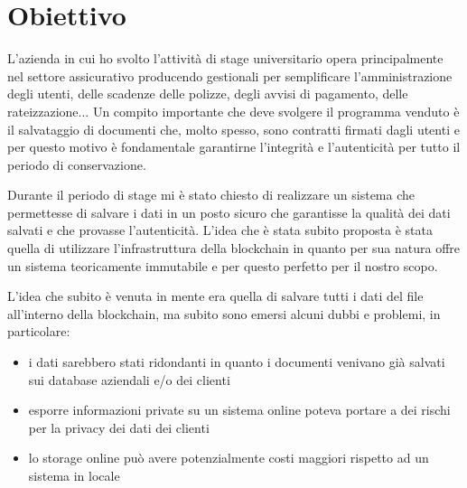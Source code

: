 \section{Obiettivo}
L'azienda in cui ho svolto l'attività di stage universitario opera
principalmente nel settore assicurativo producendo gestionali per
semplificare l'amministrazione degli utenti, delle scadenze delle polizze,
degli avvisi di pagamento, delle rateizzazione...
Un compito importante che deve svolgere il programma venduto è il salvataggio
di documenti che, molto spesso, sono contratti firmati dagli utenti e per
questo motivo è fondamentale garantirne l'integrità e l'autenticità per tutto
il periodo di conservazione.

Durante il periodo di stage mi è stato chiesto di realizzare un sistema che
permettesse di salvare i dati in un posto sicuro che garantisse la qualità dei 
dati salvati e che provasse l'autenticità. L'idea che è stata subito proposta 
è stata quella di utilizzare l'infrastruttura della blockchain in quanto per 
sua natura offre un sistema teoricamente immutabile e per questo perfetto per
il nostro scopo.

L'idea che subito è venuta in mente era quella di salvare tutti i dati del file
all'interno della blockchain, ma subito sono emersi alcuni dubbi e problemi, 
in particolare:
\begin{itemize}
    \item i dati sarebbero stati ridondanti in quanto i documenti venivano già 
        salvati sui database aziendali e/o dei clienti
    \item esporre informazioni private su un sistema online poteva portare a dei
        rischi per la privacy dei dati dei clienti 
    \item lo storage online può avere potenzialmente costi maggiori rispetto ad un 
        sistema in locale
\end{itemize}
